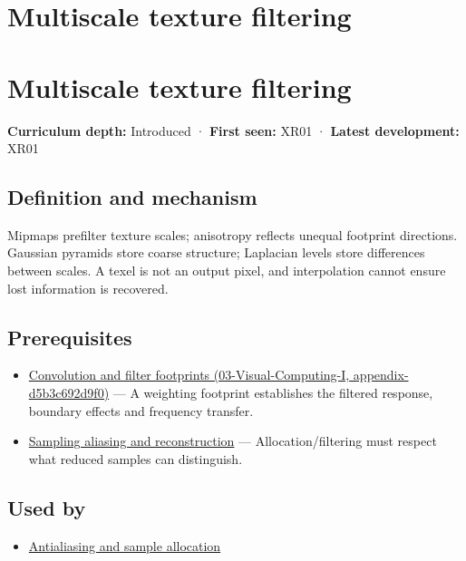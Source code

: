 \hypertarget{appendix-b677a85ba76f}{}
\section*{Multiscale texture filtering}
\section{Multiscale texture filtering}\label{appendix-b677a85ba76f-multiscale-texture-filtering}

\textbf{Curriculum depth:} Introduced · \textbf{First seen:} XR01 · \textbf{Latest development:} XR01

\subsection{Definition and mechanism}\label{appendix-b677a85ba76f-definition-and-mechanism}

Mipmaps prefilter texture scales; anisotropy reflects unequal footprint directions. Gaussian pyramids store coarse structure; Laplacian levels store differences between scales. A texel is not an output pixel, and interpolation cannot ensure lost information is recovered.

\subsection{Prerequisites}\label{appendix-b677a85ba76f-prerequisites}

\begin{itemize}
\tightlist
\item
  \href{../03-Visual-Computing-I/main.pdf\#nameddest=appendix-d5b3c692d9f0}{Convolution and filter footprints (03-Visual-Computing-I, appendix-d5b3c692d9f0)} --- A weighting footprint establishes the filtered response, boundary effects and frequency transfer.
\item
  \hyperref[appendix-6a7869dd79a6]{Sampling aliasing and reconstruction} --- Allocation/filtering must respect what reduced samples can distinguish.
\end{itemize}

\subsection{Used by}\label{appendix-b677a85ba76f-used-by}

\begin{itemize}
\tightlist
\item
  \hyperref[appendix-4192b2bdd21e]{Antialiasing and sample allocation}
\end{itemize}

